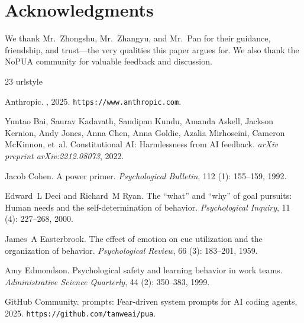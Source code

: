 \documentclass[11pt]{article}
\begin{document}
\section*{Acknowledgments}

We thank Mr.\ Zhongshu, Mr.\ Zhangyu, and Mr.\ Pan for their guidance, friendship, and trust---the very qualities this paper argues for. We also thank the NoPUA community for valuable feedback and discussion.

\begin{thebibliography}{23}
\providecommand{\natexlab}[1]{#1}
\providecommand{\url}[1]{\texttt{#1}}
\expandafter\ifx\csname urlstyle\endcsname\relax
  \providecommand{\doi}[1]{doi: #1}\else
  \providecommand{\doi}[1]{doi: \discretionary{}{}{}#1}\fi

{Anthropic}.
, 2025.
\newblock \url{https://www.anthropic.com}.

Yuntao Bai, Saurav Kadavath, Sandipan Kundu, Amanda Askell, Jackson Kernion, Andy Jones, Anna Chen, Anna Goldie, Azalia Mirhoseini, Cameron McKinnon, et~al.
\newblock Constitutional {AI}: Harmlessness from {AI} feedback.
\newblock \emph{arXiv preprint arXiv:2212.08073}, 2022.

Jacob Cohen.
\newblock A power primer.
\newblock \emph{Psychological Bulletin}, 112 (1): 155--159, 1992.

Edward~L Deci and Richard~M Ryan.
\newblock The ``what'' and ``why'' of goal pursuits: Human needs and the self-determination of behavior.
\newblock \emph{Psychological Inquiry}, 11 (4): 227--268, 2000.

James~A Easterbrook.
\newblock The effect of emotion on cue utilization and the organization of behavior.
\newblock \emph{Psychological Review}, 66 (3): 183--201, 1959.

Amy Edmondson.
\newblock Psychological safety and learning behavior in work teams.
\newblock \emph{Administrative Science Quarterly}, 44 (2): 350--383, 1999.

{GitHub Community}.
 prompts: Fear-driven system prompts for {AI} coding agents, 2025.
\newblock \url{https://github.com/tanweai/pua}.


\end{thebibliography}
\end{document}
